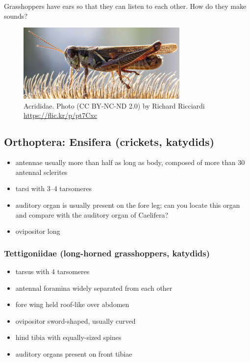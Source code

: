 \documentclass[letterpaper, 11pt]{article}
\begin{document}
\noindent{}Grasshoppers have ears so that they can listen to each other. How do they make sounds?\vspace{3cm}

\begin{figure}[ht!]
  \centering
    \includegraphics[width=0.75\textwidth]{acrid}
  \caption{Acrididae. Photo (CC BY-NC-ND 2.0) by Richard Ricciardi \url{https://flic.kr/p/pt7Cxc}}
  \label{fig:acrididhabitus}
\end{figure}

\subsection*{Orthoptera: Ensifera (crickets, katydids)}
\begin{itemize}
\item antennae usually more than half as long as body, composed of more than 30 antennal sclerites
\item tarsi with 3--4 tarsomeres
\item auditory organ is usually present on the fore leg; can you locate this organ and compare with the auditory organ of Caelifera?
\item ovipositor long
\end{itemize}

\subsubsection*{Tettigoniidae (long-horned grasshoppers, katydids)}
\begin{itemize}
\item tarsus with 4 tarsomeres
\item antennal foramina widely separated from each other
\item fore wing held roof-like over abdomen
\item ovipositor sword-shaped, usually curved
\item hind tibia with equally-sized spines
\item auditory organs present on front tibiae
\end{itemize}
\end{document}
